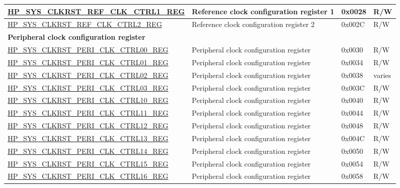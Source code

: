 \begin{longtable}{ | p{7.5cm} | p{6.2cm} | p{1.3cm} | p{1cm} | }
\hyperref[regdesc:HPSYSCLKRSTREFCLKCTRL1REG]{HP\_SYS\_CLKRST\_REF\_CLK\_CTRL1\_REG} & Reference clock configuration register 1 & 0x0028 & R/W \\ \hline
\hyperref[regdesc:HPSYSCLKRSTREFCLKCTRL2REG]{HP\_SYS\_CLKRST\_REF\_CLK\_CTRL2\_REG} & Reference clock configuration register 2 & 0x002C & R/W \\ \hline
\multicolumn{4}{|l|}{\textbf{Peripheral clock configuration register}} \\ \hline
\hyperref[regdesc:HPSYSCLKRSTPERICLKCTRL00REG]{HP\_SYS\_CLKRST\_PERI\_CLK\_CTRL00\_REG} & Peripheral clock configuration register & 0x0030 & R/W \\ \hline
\hyperref[regdesc:HPSYSCLKRSTPERICLKCTRL01REG]{HP\_SYS\_CLKRST\_PERI\_CLK\_CTRL01\_REG} & Peripheral clock configuration register & 0x0034 & R/W \\ \hline
\hyperref[regdesc:HPSYSCLKRSTPERICLKCTRL02REG]{HP\_SYS\_CLKRST\_PERI\_CLK\_CTRL02\_REG} & Peripheral clock configuration register & 0x0038 & varies \\ \hline
\hyperref[regdesc:HPSYSCLKRSTPERICLKCTRL03REG]{HP\_SYS\_CLKRST\_PERI\_CLK\_CTRL03\_REG} & Peripheral clock configuration register & 0x003C & R/W \\ \hline
\hyperref[regdesc:HPSYSCLKRSTPERICLKCTRL10REG]{HP\_SYS\_CLKRST\_PERI\_CLK\_CTRL10\_REG} & Peripheral clock configuration register  & 0x0040 & R/W \\ \hline
\hyperref[regdesc:HPSYSCLKRSTPERICLKCTRL11REG]{HP\_SYS\_CLKRST\_PERI\_CLK\_CTRL11\_REG} & Peripheral clock configuration register  & 0x0044 & R/W \\ \hline
\hyperref[regdesc:HPSYSCLKRSTPERICLKCTRL12REG]{HP\_SYS\_CLKRST\_PERI\_CLK\_CTRL12\_REG} & Peripheral clock configuration register  & 0x0048 & R/W \\ \hline
\hyperref[regdesc:HPSYSCLKRSTPERICLKCTRL13REG]{HP\_SYS\_CLKRST\_PERI\_CLK\_CTRL13\_REG} & Peripheral clock configuration register  & 0x004C & R/W \\ \hline
\hyperref[regdesc:HPSYSCLKRSTPERICLKCTRL14REG]{HP\_SYS\_CLKRST\_PERI\_CLK\_CTRL14\_REG} & Peripheral clock configuration register  & 0x0050 & R/W \\ \hline
\hyperref[regdesc:HPSYSCLKRSTPERICLKCTRL15REG]{HP\_SYS\_CLKRST\_PERI\_CLK\_CTRL15\_REG} & Peripheral clock configuration register  & 0x0054 & R/W \\ \hline
\hyperref[regdesc:HPSYSCLKRSTPERICLKCTRL16REG]{HP\_SYS\_CLKRST\_PERI\_CLK\_CTRL16\_REG} & Peripheral clock configuration register  & 0x0058 & R/W \\ \hline

\end{longtable}
